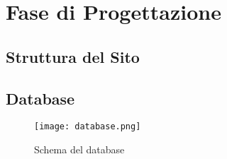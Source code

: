 \section{Fase di Progettazione}
    \subsection{Struttura del Sito}
    \subsection{Database}
        \begin{figure}[H]
            \centering
            \texttt{[image: database.png]}
            \caption{Schema del database}  \label{fig:xray}
        \end{figure}
\pagebreak